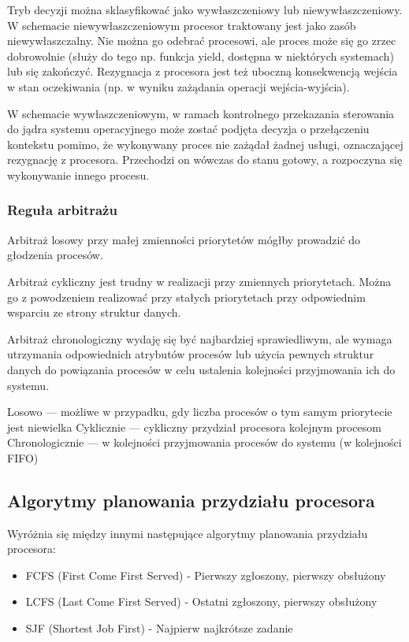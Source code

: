 \documentclass[main.tex]{subfiles}
\begin{document}
    Tryb decyzji można sklasyfikować jako wywłaszczeniowy lub niewywłaszczeniowy.
    W schemacie niewywłaszczeniowym procesor traktowany jest jako zasób niewywłaszczalny. Nie można go odebrać procesowi, ale proces może się go zrzec dobrowolnie (służy do tego np. funkcja yield, dostępna w niektórych systemach) lub się zakończyć. Rezygnacja z procesora jest też uboczną konsekwencją wejścia w stan oczekiwania (np. w wyniku zażądania operacji wejścia-wyjścia).

    W schemacie wywłaszczeniowym, w ramach kontrolnego przekazania sterowania do jądra systemu operacyjnego może zostać podjęta decyzja o przełączeniu kontekstu pomimo, że wykonywany proces nie zażądał żadnej usługi, oznaczającej rezygnację z procesora. Przechodzi on wówczas do stanu gotowy, a rozpoczyna się wykonywanie innego procesu.

    \subsubsection{Reguła arbitrażu}

    Arbitraż losowy przy małej zmienności priorytetów mógłby prowadzić do głodzenia procesów.

    Arbitraż cykliczny jest trudny w realizacji przy zmiennych priorytetach. Można go z powodzeniem realizować przy stałych priorytetach przy odpowiednim wsparciu ze strony struktur danych.

    Arbitraż chronologiczny wydaję się być najbardziej sprawiedliwym, ale wymaga utrzymania odpowiednich atrybutów procesów lub użycia pewnych struktur danych do powiązania procesów w celu ustalenia kolejności przyjmowania ich do systemu.

    Losowo — możliwe w przypadku, gdy liczba procesów o tym samym priorytecie jest niewielka
    Cyklicznie — cykliczny przydział procesora kolejnym procesom
    Chronologicznie — w kolejności przyjmowania procesów do systemu (w kolejności FIFO)

    \subsection{Algorytmy planowania przydziału procesora}

    Wyróżnia się między innymi następujące algorytmy planowania przydziału procesora:
    \begin{itemize}
        \item FCFS (First Come First Served) - Pierwszy zgłoszony, pierwszy obsłużony
        \item LCFS (Last Come First Served) - Ostatni zgłoszony, pierwszy obsłużony
        \item SJF (Shortest Job First) - Najpierw najkrótsze zadanie
    \end{itemize}
\end{document}
